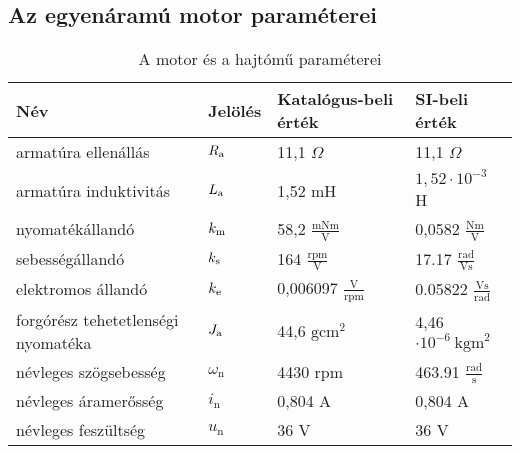 \clearpage


\subsection*{Az egyenáramú motor paraméterei}

\begin{table}[H]
\begin{tabular}{llll}\toprule
Név                                & Jelölés           & Katalógus-beli érték                    & SI-beli érték                           \\ \midrule
armatúra ellenállás                & $R_\text{a}$             & 11,1 $\Omega$                           & 11,1 $\Omega$                           \\
armatúra induktivitás              & $L_\text{a}$             & 1,52 mH                                 & $1,52\cdot10^{-3}$ H                    \\
nyomatékállandó                    & $k_\text{m}$             & 58,2 $\frac{\text{mNm}}{\text{V}}$      & 0,0582 $\frac{\text{Nm}}{\text{V}}$     \\
sebességállandó                    & $k_\text{s}$             & 164 $\frac{\text{rpm}}{\text{V}}$       & 17.17 $\frac{\text{rad}}{\text{Vs}}$    \\
elektromos állandó                 & $k_\text{e}$             & 0,006097  $\frac{\text{V}}{\text{rpm}}$ & 0.05822 $\frac{\text{Vs}}{\text{rad}}$  \\
forgórész tehetetlenségi nyomatéka & $J_\text{a}$             & 44,6 $\text{gcm}^2$                     & 4,46$\cdot10^{-6}~\text{kgm}^2$         \\
névleges szögsebesség              & $\omega_\text{n}$ & 4430 rpm                                & 463.91 $\frac{\text{rad}}{\text{s}}$    \\
névleges áramerősség               & $i_\text{n}$      & 0,804 A                                 & 0,804 A                                 \\
névleges feszültség                & $u_\text{n}$      & 36 V                                    & 36 V                                    \\ \bottomrule
\end{tabular}
\caption{A motor és a hajtómű paraméterei}
\end{table}
